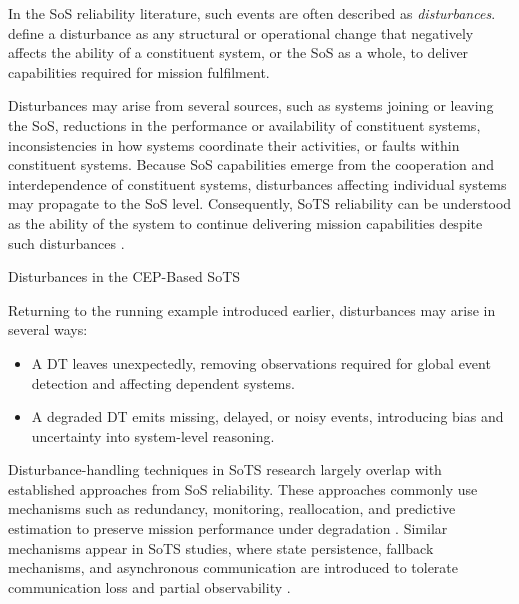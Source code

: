 In the SoS reliability literature, such events are often described as \emph{disturbances}. \citet{ferreira2023towards} define a disturbance as any structural or operational change that negatively affects the ability of a constituent system, or the SoS as a whole, to deliver capabilities required for mission fulfilment.

Disturbances may arise from several sources, such as systems joining or leaving the SoS, reductions in the performance or availability of constituent systems, inconsistencies in how systems coordinate their activities, or faults within constituent systems. Because SoS capabilities emerge from the cooperation and interdependence of constituent systems, disturbances affecting individual systems may propagate to the SoS level. Consequently, SoTS reliability can be understood as the ability of the system to continue delivering mission capabilities despite such disturbances \cite{ferreira2023towards}.

\begin{runningexample}{Disturbances in the CEP-Based SoTS}

Returning to the running example introduced earlier, disturbances may arise in several ways:
\begin{center}

\end{center}
\begin{itemize}[noitemsep]
    \item A DT leaves unexpectedly, removing observations required for global event detection and affecting dependent systems.
    \item A degraded DT emits missing, delayed, or noisy events, introducing bias and uncertainty into system-level reasoning.
\end{itemize}
\end{runningexample}

Disturbance-handling techniques in SoTS research largely overlap with established approaches from SoS reliability. These approaches commonly use mechanisms such as redundancy, monitoring, reallocation, and predictive estimation to preserve mission performance under degradation \cite{ferreira2021reliability, uday2015designing, abdelmoumen2026comprehensive}. Similar mechanisms appear in SoTS studies, where state persistence, fallback mechanisms, and asynchronous communication are introduced to tolerate communication loss and partial observability \cite{esterle2021digital,larsen2024towards,lopez2023modeling,chen2018digital,joseph2021aggregated}.

